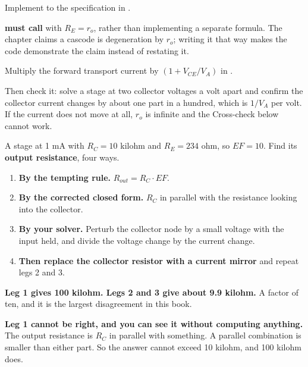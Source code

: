 \label{c7:ex:6}
Implement  to the specification in .

\textbf{ must call } with $R_E = r_o$, rather than implementing a separate formula. The chapter claims a cascode is degeneration by $r_o$; writing it that way makes the code demonstrate the claim instead of restating it.

\label{c7:ex:7}
Multiply the forward transport current by $(1 + V_{CE}/V_A)$ in .

Then check it: solve a stage at two collector voltages a volt apart and confirm the collector current changes by about one part in a hundred, which is $1/V_A$ per volt. If the current does not move at all, $r_o$ is infinite and the Cross-check below cannot work.

\label{c7:ex:8}
A stage at 1 mA with $R_C = 10$ kilohm and $R_E = 234$ ohm, so $EF = 10$. Find its \textbf{output resistance}, four ways.

\begin{enumerate}
  \item \textbf{By the tempting rule.} $R_{out} = R_C \cdot EF$.
  \item \textbf{By the corrected closed form.} $R_C$ in parallel with the resistance looking into the collector.
  \item \textbf{By your solver.} Perturb the collector node by a small voltage with the input held, and divide the voltage change by the current change.
  \item \textbf{Then replace the collector resistor with a current mirror} and repeat legs 2 and 3.
\end{enumerate}

\textbf{Leg 1 gives 100 kilohm. Legs 2 and 3 give about 9.9 kilohm.} A factor of ten, and it is the largest disagreement in this book.

\textbf{Leg 1 cannot be right, and you can see it without computing anything.} The output resistance is $R_C$ in parallel with something. A parallel combination is smaller than either part. So the answer cannot exceed 10 kilohm, and 100 kilohm does.

